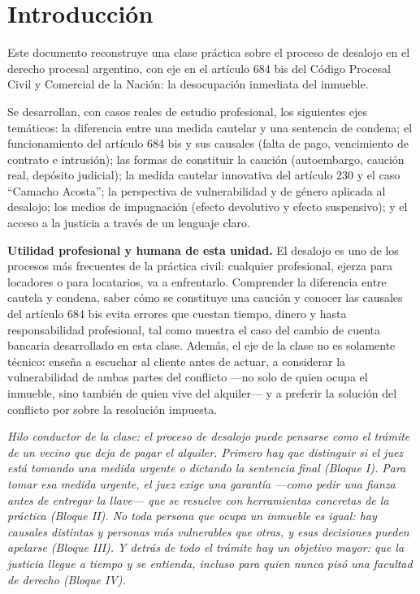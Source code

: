 \documentclass[12pt,oneside]{book}
\begin{document}
\chapter*{Introducción}

Este documento reconstruye una clase práctica sobre el proceso de desalojo en el derecho procesal argentino, con eje en el artículo 684 bis del Código Procesal Civil y Comercial de la Nación: la desocupación inmediata del inmueble.

Se desarrollan, con casos reales de estudio profesional, los siguientes ejes temáticos: la diferencia entre una medida cautelar y una sentencia de condena; el funcionamiento del artículo 684 bis y sus causales (falta de pago, vencimiento de contrato e intrusión); las formas de constituir la caución (autoembargo, caución real, depósito judicial); la medida cautelar innovativa del artículo 230 y el caso ``Camacho Acosta''; la perspectiva de vulnerabilidad y de género aplicada al desalojo; los medios de impugnación (efecto devolutivo y efecto suspensivo); y el acceso a la justicia a través de un lenguaje claro.

\textbf{Utilidad profesional y humana de esta unidad.} El desalojo es uno de los procesos más frecuentes de la práctica civil: cualquier profesional, ejerza para locadores o para locatarios, va a enfrentarlo. Comprender la diferencia entre cautela y condena, saber cómo se constituye una caución y conocer las causales del artículo 684 bis evita errores que cuestan tiempo, dinero y hasta responsabilidad profesional, tal como muestra el caso del cambio de cuenta bancaria desarrollado en esta clase. Además, el eje de la clase no es solamente técnico: enseña a escuchar al cliente antes de actuar, a considerar la vulnerabilidad de ambas partes del conflicto ---no solo de quien ocupa el inmueble, sino también de quien vive del alquiler--- y a preferir la solución del conflicto por sobre la resolución impuesta.

\textit{Hilo conductor de la clase: el proceso de desalojo puede pensarse como el trámite de un vecino que deja de pagar el alquiler. Primero hay que distinguir si el juez está tomando una medida urgente o dictando la sentencia final (Bloque I). Para tomar esa medida urgente, el juez exige una garantía ---como pedir una fianza antes de entregar la llave--- que se resuelve con herramientas concretas de la práctica (Bloque II). No toda persona que ocupa un inmueble es igual: hay causales distintas y personas más vulnerables que otras, y esas decisiones pueden apelarse (Bloque III). Y detrás de todo el trámite hay un objetivo mayor: que la justicia llegue a tiempo y se entienda, incluso para quien nunca pisó una facultad de derecho (Bloque IV).}
\end{document}
